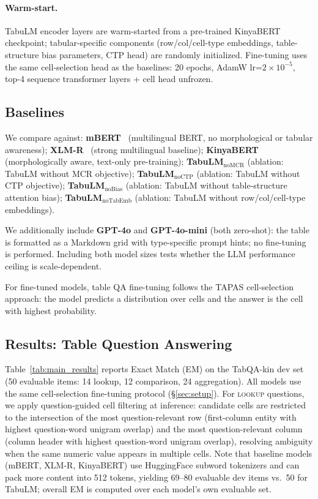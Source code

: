 \documentclass[11pt]{article}
\begin{document}
\paragraph{Warm-start.}
TabuLM encoder layers are warm-started from a pre-trained KinyaBERT checkpoint; tabular-specific components (row/col/cell-type embeddings, table-structure bias parameters, CTP head) are randomly initialized.
Fine-tuning uses the same cell-selection head as the baselines: 20 epochs, AdamW lr=$2\times10^{-5}$, top-4 sequence transformer layers + cell head unfrozen.

\subsection{Baselines}
\label{sec:baselines}

We compare against:
\textbf{mBERT}~\citep{devlin-etal-2019-bert} (multilingual BERT, no morphological or tabular awareness);
\textbf{XLM-R}~\citep{conneau-etal-2020-unsupervised} (strong multilingual baseline);
\textbf{KinyaBERT}~\citep{nzeyimana-niyongabo-rubungo-2022-kinyabert} (morphologically aware, text-only pre-training);
\textbf{TabuLM$_{\text{noMCR}}$} (ablation: TabuLM without MCR objective);
\textbf{TabuLM$_{\text{noCTP}}$} (ablation: TabuLM without CTP objective);
\textbf{TabuLM$_{\text{noBias}}$} (ablation: TabuLM without table-structure attention bias);
\textbf{TabuLM$_{\text{noTabEmb}}$} (ablation: TabuLM without row/col/cell-type embeddings).

We additionally include \textbf{GPT-4o} and \textbf{GPT-4o-mini} (both zero-shot): the table is formatted as a Markdown grid with type-specific prompt hints; no fine-tuning is performed. Including both model sizes tests whether the LLM performance ceiling is scale-dependent.

For fine-tuned models, table QA fine-tuning follows the TAPAS cell-selection approach: the model predicts a distribution over cells and the answer is the cell with highest probability.

\subsection{Results: Table Question Answering}
\label{sec:results_qa}

Table~\ref{tab:main_results} reports Exact Match (EM) on the TabQA-kin dev set (50 evaluable items: 14 lookup, 12 comparison, 24 aggregation).
All models use the same cell-selection fine-tuning protocol (§\ref{sec:setup}).
For \textsc{lookup} questions, we apply question-guided cell filtering at inference: candidate cells are restricted to the intersection of the most question-relevant row (first-column entity with highest question-word unigram overlap) and the most question-relevant column (column header with highest question-word unigram overlap), resolving ambiguity when the same numeric value appears in multiple cells.
Note that baseline models (mBERT, XLM-R, KinyaBERT) use HuggingFace subword tokenizers and can pack more content into 512 tokens, yielding 69--80 evaluable dev items vs.\ 50 for TabuLM; overall EM is computed over each model's own evaluable set.
\end{document}
